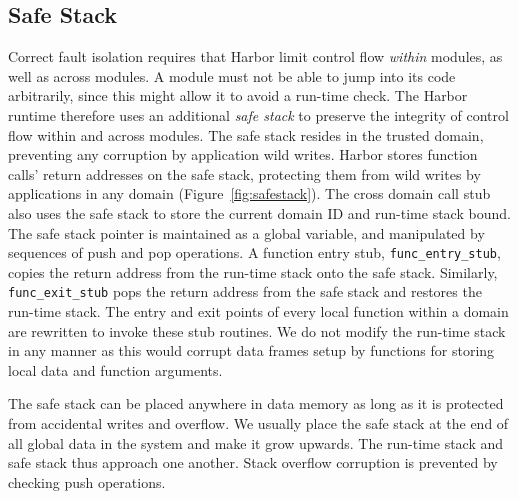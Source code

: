 \subsection{Safe Stack}
\label{subsec:safe_stack}
%
Correct fault isolation requires that Harbor limit control flow
\emph{within} modules, as well as across modules.
%
A module must not be able to jump into its code arbitrarily, since this
might allow it to avoid a run-time check.
%
The Harbor runtime therefore uses an additional \emph{safe stack}
to preserve the integrity of control flow within and across modules.
%
The safe stack resides in the
trusted domain, preventing any corruption by application wild writes.
%
%
%
Harbor stores function calls' return addresses on the safe stack,
protecting them from wild writes by applications in any domain
(Figure~\ref{fig:safestack}).
%
The cross domain call stub also uses the safe stack to store the current
domain ID and run-time stack bound.
%
The safe stack pointer is maintained as a global variable, and manipulated
by sequences of push and pop operations.
%
%
%
%
%
%
%
A function entry stub, \texttt{func\_entry\_stub}, copies the return
address from the run-time stack onto the safe stack.
%
Similarly, \texttt{func\_exit\_stub} pops the return address from
the safe stack and restores the run-time stack.
%
The entry and exit points of every local function within a domain are
rewritten to invoke these stub routines.
%
%
%
We do not modify the run-time stack in any manner as this would corrupt data
frames setup by functions for storing local data and function
arguments.
%

The safe stack can be placed anywhere in data memory as long as it is
protected from accidental writes and overflow.
%
We usually place the safe stack at the end of all global data in the
system and make it grow upwards.
%
The run-time stack and safe stack thus approach one another.
%
%
Stack overflow corruption is prevented by checking push operations.

